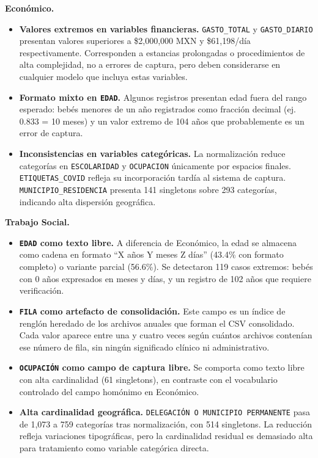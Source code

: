 \textbf{Económico.}
\begin{itemize}
    \item \textbf{Valores extremos en variables financieras.} \texttt{GASTO\_TOTAL} y \texttt{GASTO\_DIARIO} presentan valores superiores a \$2,000,000 MXN y \$61,198/día respectivamente. Corresponden a estancias prolongadas o procedimientos de alta complejidad, no a errores de captura, pero deben considerarse en cualquier modelo que incluya estas variables.

    \item \textbf{Formato mixto en \texttt{EDAD}.} Algunos registros presentan edad fuera del rango esperado: bebés menores de un año registrados como fracción decimal (ej. 0.833 = 10 meses) y un valor extremo de 104 años que probablemente es un error de captura.

    \item \textbf{Inconsistencias en variables categóricas.} La normalización reduce categorías en \texttt{ESCOLARIDAD} y \texttt{OCUPACION} únicamente por espacios finales. \texttt{ETIQUETAS\_COVID} refleja su incorporación tardía al sistema de captura. \texttt{MUNICIPIO\_RESIDENCIA} presenta 141 singletons sobre 293 categorías, indicando alta dispersión geográfica.
\end{itemize}

\textbf{Trabajo Social.}
\begin{itemize}
    \item \textbf{\texttt{EDAD} como texto libre.} A diferencia de Económico, la edad se almacena como cadena en formato ``X años Y meses Z días'' (43.4\% con formato completo) o variante parcial (56.6\%). Se detectaron 119 casos extremos: bebés con 0 años expresados en meses y días, y un registro de 102 años que requiere verificación.

    \item \textbf{\texttt{FILA} como artefacto de consolidación.} Este campo es un índice de renglón heredado de los archivos anuales que forman el CSV consolidado. Cada valor aparece entre una y cuatro veces según cuántos archivos contenían ese número de fila, sin ningún significado clínico ni administrativo.

    \item \textbf{\texttt{OCUPACIÓN} como campo de captura libre.} Se comporta como texto libre con alta cardinalidad (61 singletons), en contraste con el vocabulario controlado del campo homónimo en Económico.

    \item \textbf{Alta cardinalidad geográfica.} \texttt{DELEGACIÓN O MUNICIPIO PERMANENTE} pasa de 1,073 a 759 categorías tras normalización, con 514 singletons. La reducción refleja variaciones tipográficas, pero la cardinalidad residual es demasiado alta para tratamiento como variable categórica directa.
\end{itemize}

